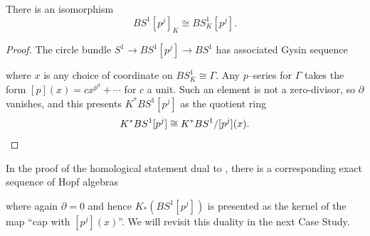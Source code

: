 \begin{theorem}\label{KtheoryConvertsTorsionToTorsion}
There is an isomorphism \[BS^1[p^j]_K \cong BS^1_K[p^j].\]
\end{theorem}
\begin{proof}
The circle bundle \(S^1 \to BS^1[p^j] \to BS^1\) has associated Gysin sequence
\begin{center}
\end{center}
where \(x\) is any choice of coordinate on \(BS^1_{K} \cong \Gamma\).
Any \(p\)--series for \(\Gamma\) takes the form \([p](x) = c x^{p^d} + \cdots\) for \(c\) a unit.
Such an element is not a zero-divisor, so \(\partial\) vanishes, and this presents \(K^* BS^1[p^j]\) as the quotient ring \[K^* BS^1[p^j] \cong K^* BS^1 / [p^j](x). \qedhere\]
\end{proof}

\begin{remark}\label{KHomologyOfClassifyingSpace}
In the proof of the homological statement dual to , there is a corresponding exact sequence of Hopf algebras
\begin{center}
\end{center}
where again \(\partial = 0\) and hence \(K_*(BS^1[p^j])\) is presented as the kernel of the map ``cap with \([p^j](x)\)''.
We will revisit this duality in the next Case Study.
\end{remark}


